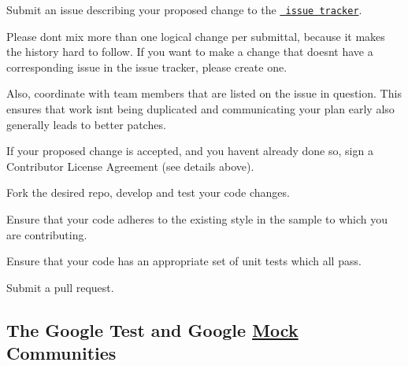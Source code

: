 \begin{DoxyEnumerate}
\item Submit an issue describing your proposed change to the \href{https://github.com/google/googletest}{\texttt{ issue tracker}}.
\end{DoxyEnumerate}
\begin{DoxyEnumerate}
\item Please don\textquotesingle{}t mix more than one logical change per submittal, because it makes the history hard to follow. If you want to make a change that doesn\textquotesingle{}t have a corresponding issue in the issue tracker, please create one.
\end{DoxyEnumerate}
\begin{DoxyEnumerate}
\item Also, coordinate with team members that are listed on the issue in question. This ensures that work isn\textquotesingle{}t being duplicated and communicating your plan early also generally leads to better patches.
\end{DoxyEnumerate}
\begin{DoxyEnumerate}
\item If your proposed change is accepted, and you haven\textquotesingle{}t already done so, sign a Contributor License Agreement (see details above).
\end{DoxyEnumerate}
\begin{DoxyEnumerate}
\item Fork the desired repo, develop and test your code changes.
\end{DoxyEnumerate}
\begin{DoxyEnumerate}
\item Ensure that your code adheres to the existing style in the sample to which you are contributing.
\end{DoxyEnumerate}
\begin{DoxyEnumerate}
\item Ensure that your code has an appropriate set of unit tests which all pass.
\end{DoxyEnumerate}
\begin{DoxyEnumerate}
\item Submit a pull request.
\end{DoxyEnumerate}

\subsection*{The Google Test and Google \mbox{\hyperlink{class_mock}{Mock}} Communities}

